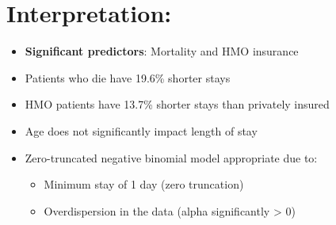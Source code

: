 \documentclass[12pt, a4paper]{article}
\begin{document}
\section*{Interpretation:}
\begin{itemize}
    \item \textbf{Significant predictors}: Mortality and HMO insurance
    \item Patients who die have 19.6\% shorter stays
    \item HMO patients have 13.7\% shorter stays than privately insured
    \item Age does not significantly impact length of stay
    \item Zero-truncated negative binomial model appropriate due to:
        \begin{itemize}
            \item Minimum stay of 1 day (zero truncation)
            \item Overdispersion in the data (alpha significantly > 0)
        \end{itemize}
\end{itemize}
\end{document}
